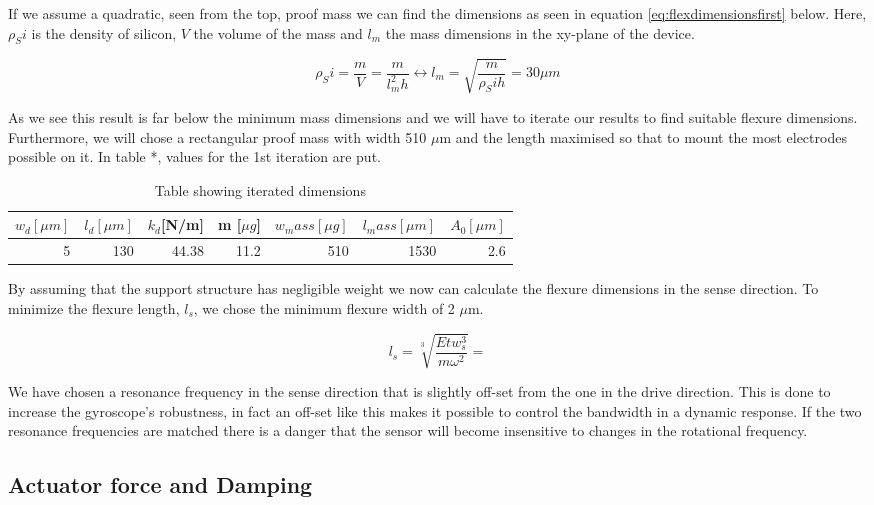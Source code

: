 \documentclass[12pt,a4paper,titlepage]{article}
\begin{document}
\begin{spacing}{1.1}
If we assume a quadratic, seen from the top, proof mass we can find the dimensions as seen in  equation \ref{eq:flexdimensionsfirst} below. Here, $\rho_Si$ is the density of silicon, $V$ the volume of the mass and $l_m$ the mass dimensions in the xy-plane of the device.

\begin{equation}
\rho_Si = \dfrac{m}{V} = \dfrac{m}{l_m^2 h} \leftrightarrow l_m = \sqrt{\dfrac{m}{\rho_Si h}} = 30 \mu m
\label{eq:flexdimensionsfirst}
\end{equation}

As we see this result is far below the minimum mass dimensions and we will have to iterate our results to find suitable flexure dimensions. Furthermore, we will chose a rectangular proof mass with width 510 $\mu$m and the length maximised so that to mount the most electrodes possible on it. In table *, values for the 1st iteration are put.

\begin{table}[htbp]
\caption{Table showing iterated dimensions}
\centering
\begin{tabular}{lllllll}
\toprule
$w_d [\mu m]$ & $l_d [\mu m]$ & $k_d$[N/m] & m [$\mu g$] & $w_mass [\mu g]$ & $l_mass [\mu m]$ & $A_0 [\mu m]$ \\ \midrule
\multicolumn{1}{r}{5} & \multicolumn{1}{r}{130} & \multicolumn{1}{r}{44.38} & \multicolumn{1}{r}{11.2} & \multicolumn{1}{r}{510} & \multicolumn{1}{r}{1530} & \multicolumn{1}{r}{2.6} \\ \bottomrule
\end{tabular}
\label{tab:1stiteration}
\end{table}

By assuming that the support structure has negligible weight we now can calculate the flexure dimensions in the sense direction. To minimize the flexure length, $l_s$, we chose the minimum flexure width of 2 $\mu$m.

\begin{equation}
l_s = \sqrt[3]{\dfrac{E t w_s^3}{m \omega^2} } =
\label{eq:senselength}
\end{equation}

We have chosen a resonance frequency in the sense direction that is slightly off-set from the one in the drive direction. This is done to increase the gyroscope's robustness, in fact an off-set like this makes it possible to control the bandwidth in a dynamic response. If the two resonance frequencies are matched there is a danger that the sensor will become insensitive to changes in the rotational frequency.

\subsection{Actuator force and Damping}



\end{spacing}
\printbibliography
\end{document}
